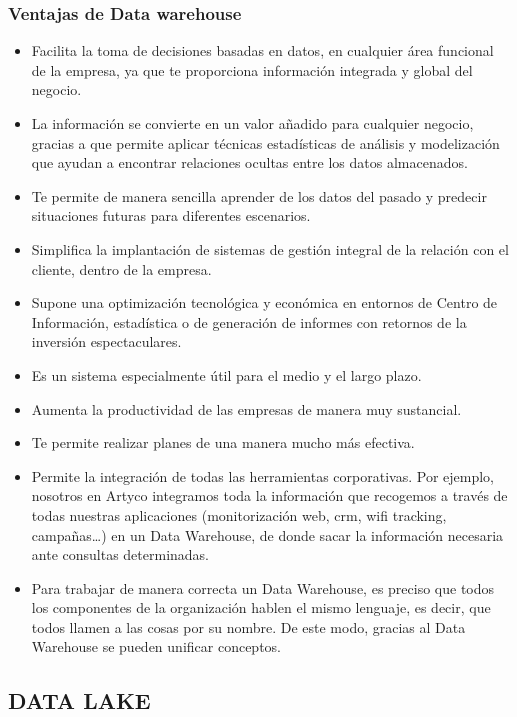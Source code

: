 \documentclass[twoside,twocolumn]{article}
\begin{document}
\subsubsection{Ventajas de Data warehouse}

\begin{itemize}
    \item  Facilita la toma de decisiones basadas en datos, en cualquier área funcional de la empresa, ya que te proporciona información integrada y global del negocio.
    \item  La información se convierte en un valor añadido para cualquier negocio, gracias a que permite aplicar técnicas estadísticas de análisis y modelización que ayudan a encontrar relaciones ocultas entre los datos almacenados.
    \item Te permite de manera sencilla aprender de los datos del pasado y predecir situaciones futuras para diferentes escenarios.
    \item   Simplifica la implantación de sistemas de gestión integral de la relación con el cliente, dentro de la empresa.
    \item  Supone una optimización tecnológica y económica en entornos de Centro de Información, estadística o de generación de informes con retornos de la inversión espectaculares.
   \item Es un sistema especialmente útil para el medio y el largo plazo.
   \item Aumenta la productividad de las empresas de manera muy sustancial.
  \item Te permite realizar planes de una manera mucho más efectiva.
  \item Permite la integración de todas las herramientas corporativas. Por ejemplo, nosotros en Artyco integramos toda la información que recogemos a través de todas nuestras aplicaciones (monitorización web, crm, wifi tracking, campañas…) en un Data Warehouse, de donde sacar la información necesaria ante consultas determinadas.
  \item Para trabajar de manera correcta un Data Warehouse, es preciso que todos los componentes de la organización hablen el mismo lenguaje, es decir, que todos llamen a las cosas por su nombre. De este modo, gracias al Data Warehouse se pueden unificar conceptos. 
\end{itemize}


\subsection{DATA LAKE}
\end{document}
